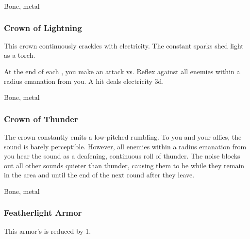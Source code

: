  


 Bone, metal


\lowercase{\hypertarget{item:Crown of Lightning}{}}\label{item:Crown of Lightning}
\hypertarget{item:Crown of Lightning}{\subsubsection{Crown of Lightning\hfill{}}}

This crown continuously crackles with electricity.
The constant sparks shed light as a torch.

At the end of each , you make an attack vs. Reflex against all enemies within a \areamed radius emanation from you.
A hit deals electricity  \minus3d.



 


 Bone, metal


\lowercase{\hypertarget{item:Crown of Thunder}{}}\label{item:Crown of Thunder}
\hypertarget{item:Crown of Thunder}{\subsubsection{Crown of Thunder\hfill{}}}

The crown constantly emits a low-pitched rumbling.
To you and your allies, the sound is barely perceptible.
However, all enemies within a \arealarge radius emanation from you hear the sound as a deafening, continuous roll of thunder.
The noise blocks out all other sounds quieter than thunder, causing them to be \deafened while they remain in the area and until the end of the next round after they leave.



 


 Bone, metal


\lowercase{\hypertarget{item:Featherlight Armor}{}}\label{item:Featherlight Armor}
\hypertarget{item:Featherlight Armor}{\subsubsection{Featherlight Armor\hfill{}}}

This armor's  is reduced by 1.



